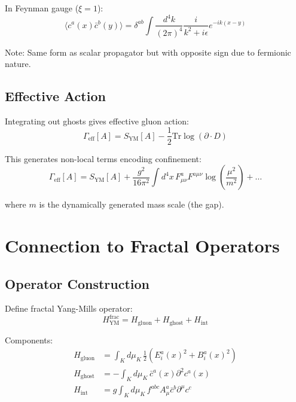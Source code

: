 In Feynman gauge ($\xi = 1$):
\begin{equation}
\langle c^a(x) \bar{c}^b(y) \rangle = \delta^{ab} \int \frac{d^4k}{(2\pi)^4} \frac{i}{k^2 + i\epsilon} e^{-ik(x-y)}
\end{equation}

Note: Same form as scalar propagator but with opposite sign due to fermionic nature.

\subsection{Effective Action}

Integrating out ghosts gives effective gluon action:
\begin{equation}
\Gamma_{\text{eff}}[A] = S_{\text{YM}}[A] - \frac{1}{2} \text{Tr} \log(\partial \cdot D)
\end{equation}

This generates non-local terms encoding confinement:
\begin{equation}
\Gamma_{\text{eff}}[A] = S_{\text{YM}}[A] + \frac{g^2}{16\pi^2} \int d^4x \, F_{\mu\nu}^a F^{a\mu\nu} \log\left(\frac{\mu^2}{m^2}\right) + \ldots
\end{equation}

where $m$ is the dynamically generated mass scale (the gap).

\section{Connection to Fractal Operators}

\subsection{Operator Construction}

Define fractal Yang-Mills operator:
\begin{equation}
H_{\text{YM}}^{\text{frac}} = H_{\text{gluon}} + H_{\text{ghost}} + H_{\text{int}}
\end{equation}

Components:
\begin{align}
H_{\text{gluon}} &= \int_K d\mu_K \, \frac{1}{2} \left( E_i^a(x)^2 + B_i^a(x)^2 \right) \\
H_{\text{ghost}} &= - \int_K d\mu_K \, \bar{c}^a(x) \partial^2 c^a(x) \\
H_{\text{int}} &= g \int_K d\mu_K \, f^{abc} A_\mu^a \bar{c}^b \partial^\mu c^c
\end{align}


